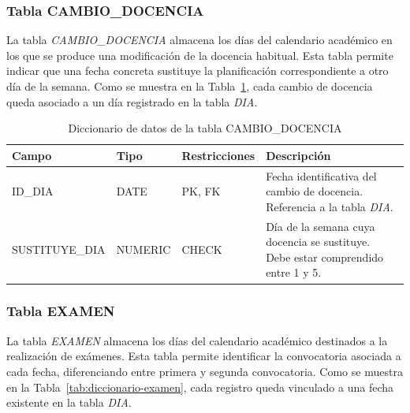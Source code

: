 \subsubsection{Tabla CAMBIO\_DOCENCIA}

\noindent La tabla \textit{CAMBIO\_DOCENCIA} almacena los días del calendario académico en los que se produce una modificación de la docencia habitual. Esta tabla permite indicar que una fecha concreta sustituye la planificación correspondiente a otro día de la semana. Como se muestra en la Tabla~\ref{tab:diccionario-cambio-docencia}, cada cambio de docencia queda asociado a un día registrado en la tabla \textit{DIA}.\\

\begin{table}[H]
	\centering
	\scriptsize
	\setlength{\tabcolsep}{3pt}
	\renewcommand{\arraystretch}{1.15}
	\begin{tabularx}{\textwidth}{@{}
			>{\raggedright\arraybackslash}p{2.6cm}
			>{\raggedright\arraybackslash}p{2.2cm}
			>{\raggedright\arraybackslash}p{2.2cm}
			X@{}}
		\toprule
		\textbf{Campo} & \textbf{Tipo} & \textbf{Restricciones} & \textbf{Descripción} \\
		\midrule
		ID\_DIA & DATE & PK, FK & Fecha identificativa del cambio de docencia. Referencia a la tabla \textit{DIA}. \\
		SUSTITUYE\_\newline DIA & NUMERIC & CHECK & Día de la semana cuya docencia se sustituye. Debe estar comprendido entre 1 y 5. \\
		\bottomrule
	\end{tabularx}
	\caption{Diccionario de datos de la tabla CAMBIO\_DOCENCIA}
	\label{tab:diccionario-cambio-docencia}
\end{table}

\subsubsection{Tabla EXAMEN}

\noindent La tabla \textit{EXAMEN} almacena los días del calendario académico destinados a la realización de exámenes. Esta tabla permite identificar la convocatoria asociada a cada fecha, diferenciando entre primera y segunda convocatoria. Como se muestra en la Tabla~\ref{tab:diccionario-examen}, cada registro queda vinculado a una fecha existente en la tabla \textit{DIA}.\\

